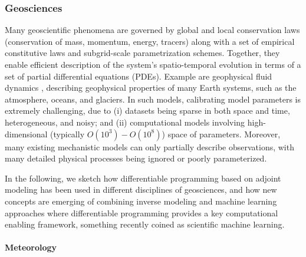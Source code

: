 \subsubsection{Geosciences}

Many geoscientific phenomena are governed by global and local conservation laws (conservation of mass, momentum, energy, tracers) along with a set of empirical constitutive laws and subgrid-scale parametrization schemes. 
Together, they enable efficient description of the system's spatio-temporal evolution in terms of a set of partial differential equations (PDEs).
Example are geophysical fluid dynamics \cite{Vallis:2016kv}, describing geophysical properties of many Earth systems, such as the atmosphere, oceans, and glaciers.
In such models, calibrating model parameters is extremely challenging, due to (i) datasets being sparse in both space and time, heterogeneous, and noisy; and (ii) computational models involving high-dimensional (typically $O(10^3) - O(10^8)$) space of parameters.
Moreover, many existing mechanistic models can only partially describe observations, with many detailed physical processes being ignored or poorly parameterized. 

In the following, we sketch how differentiable programming based on  adjoint modeling has been used in different disciplines of geosciences, and how new concepts are emerging of combining inverse modeling and machine learning approaches where differentiable programming provides a key computational enabling framework, something recently coined as scientific machine learning. 

\paragraph{Meteorology}

